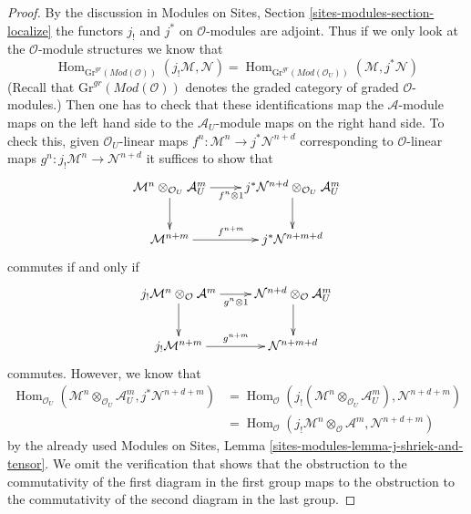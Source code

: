 \documentclass[10pt,a4paper]{amsart}
\theoremstyle{plain}
\theoremstyle{definition}
\theoremstyle{remark}
\numberwithin{equation}{subsection}
\def\Hom{\mathop{\mathrm{Hom}}\nolimits}
\begin{document}
\begin{proof}
By the discussion in
Modules on Sites, Section \ref{sites-modules-section-localize}
the functors $j_!$ and $j^*$ on $\mathcal{O}$-modules are adjoint.
Thus if we only look at the $\mathcal{O}$-module structures
we know that
$$
\Hom_{\text{Gr}^{gr}(\textit{Mod}(\mathcal{O}))}(
j_!\mathcal{M}, \mathcal{N}) =
\Hom_{\text{Gr}^{gr}(\textit{Mod}(\mathcal{O}_U))}(
\mathcal{M}, j^*\mathcal{N})
$$
(Recall that $\text{Gr}^{gr}(\textit{Mod}(\mathcal{O}))$ denotes
the graded category of graded $\mathcal{O}$-modules.)
Then one has to check that these identifications map the
$\mathcal{A}$-module maps on the left hand side to the
$\mathcal{A}_U$-module maps on the right hand side.
To check this, given $\mathcal{O}_U$-linear maps
$f^n : \mathcal{M}^n \to j^*\mathcal{N}^{n + d}$
corresponding to $\mathcal{O}$-linear maps
$g^n : j_!\mathcal{M}^n \to \mathcal{N}^{n + d}$
it suffices to show that
$$
\xymatrix{
\mathcal{M}^n \otimes_{\mathcal{O}_U} \mathcal{A}_U^m
\ar[r]_{f^n \otimes 1} \ar[d] &
j^*\mathcal{N}^{n + d} \otimes_{\mathcal{O}_U} \mathcal{A}_U^m \ar[d] \\
\mathcal{M}^{n + m} \ar[r]^{f^{n + m}} &
j^*\mathcal{N}^{n + m + d}
}
$$
commutes if and only if
$$
\xymatrix{
j_!\mathcal{M}^n \otimes_\mathcal{O} \mathcal{A}^m
\ar[r]_{g^n \otimes 1} \ar[d] &
\mathcal{N}^{n + d} \otimes_\mathcal{O} \mathcal{A}_U^m \ar[d] \\
j_!\mathcal{M}^{n + m} \ar[r]^{g^{n + m}} &
\mathcal{N}^{n + m + d}
}
$$
commutes. However, we know that
\begin{align*}
\Hom_{\mathcal{O}_U}(\mathcal{M}^n \otimes_{\mathcal{O}_U} \mathcal{A}_U^m,
j^*\mathcal{N}^{n + d + m})
& =
\Hom_\mathcal{O}(j_!(\mathcal{M}^n \otimes_{\mathcal{O}_U} \mathcal{A}_U^m),
\mathcal{N}^{n + d + m}) \\
& =
\Hom_\mathcal{O}(j_!\mathcal{M}^n \otimes_\mathcal{O} \mathcal{A}^m,
\mathcal{N}^{n + d + m})
\end{align*}
by the already used
Modules on Sites, Lemma \ref{sites-modules-lemma-j-shriek-and-tensor}.
We omit the verification that shows that the obstruction to the
commutativity of the first diagram in the first group maps
to the obstruction to the commutativity of the second diagram
in the last group.
\end{proof}
\end{document}
